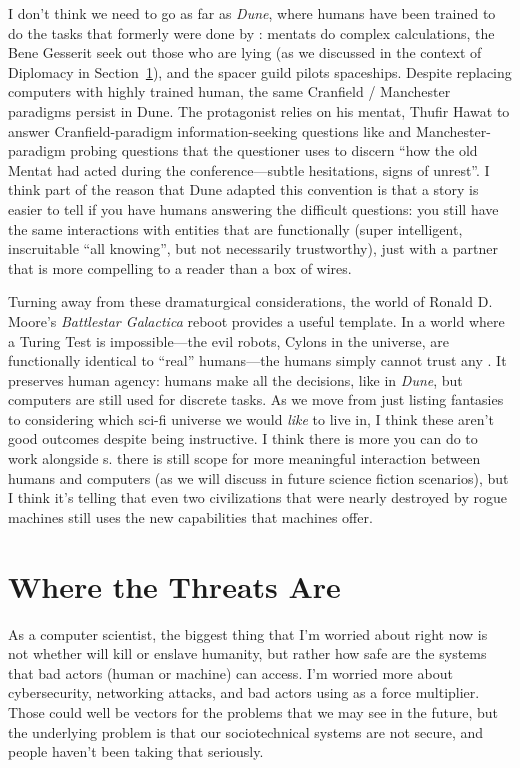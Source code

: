 I don't think we need to go as far as \textit{Dune}, where humans have
been trained to do the tasks that formerly were done by :
mentats do complex calculations, the Bene Gesserit seek out those who
are lying (as we discussed in the context of Diplomacy in
Section~\ref{}), and the spacer guild pilots spaceships.
%
Despite replacing computers with highly trained human, the same
Cranfield / Manchester paradigms persist in Dune.
%
The protagonist relies on his mentat, Thufir Hawat to answer
Cranfield-paradigm information-seeking questions like  and Manchester-paradigm probing
questions that the questioner uses to discern ``how the old Mentat had
acted during the conference---subtle hesitations, signs of unrest''.
%
I think part of the reason that Dune adapted this convention is that a
story is easier to tell if you have humans answering the difficult
questions: you still have the same interactions with entities that are
functionally  (super intelligent, inscruitable ``all
knowing'', but not necessarily trustworthy), just with a partner that
is more compelling to a reader than a box of wires.

Turning away from these dramaturgical considerations, the world of Ronald D. Moore's \textit{Battlestar Galactica}
reboot provides a useful template.
%
In a world where a Turing Test is impossible---the evil robots, Cylons
in the universe, are functionally identical to ``real'' humans---the
humans simply cannot trust any .
%
It preserves human agency: humans make all the decisions, like in
\textit{Dune}, but computers are still used for discrete tasks.
%
As we move from just listing fantasies to considering which sci-fi
universe we would \emph{like} to live in, I think these aren't good
outcomes despite being instructive.
%
I think there is more you can do to work alongside s.
there is still scope for more meaningful interaction between
humans and computers (as we will discuss in future science fiction
scenarios), but I think it's telling that even two civilizations that
were nearly destroyed by rogue machines still uses the new
capabilities that machines offer.

\section{Where the Threats Are}

As a computer scientist, the biggest thing that I'm worried about
right now is not whether  will kill or enslave humanity, but
rather how safe are the systems that bad actors (human or machine) can
access. I'm worried more about cybersecurity, networking attacks, and
bad actors using  as a force multiplier. Those could well be
vectors for the  problems that we may see in the future, but
the underlying problem is that our sociotechnical systems are not
secure, and people haven't been taking that seriously.

